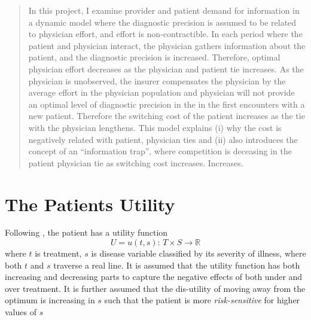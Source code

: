 \documentclass[10pt,a4paper]{article} 					%
\begin{document}
\maketitle


\begin{abstract}
In this project, I examine provider and patient demand for information in a dynamic model where the diagnostic precision is assumed to be related to physician effort, and effort is non-contractible. In each period where the patient and physician interact, the physician gathers information about the patient, and the diagnostic precision is increased. Therefore, optimal physician effort decreases as the physician and patient tie increases. As the physician is unobserved, the insurer compensates the physician by the average effort in the physician population and physician will not provide an optimal level of diagnostic precision in the in the first encounters with a new patient. Therefore the switching cost of the patient increases as the tie with the physician lengthens. This model explains (i) why the cost is negatively related with patient, physician ties and (ii) also introduces the concept of an ``information trap'', where competition is deceasing in the patient physician tie as switching cost increases. Increases.
\end{abstract}


\section{The Patients Utility}

Following \citet{Rochaix1989}, the patient has a utility function
\[
	U = u(t,s):\, T\times S\rightarrow\mathbb{R}
\]
where \(t\) is treatment, \(s\) is disease variable classified by its severity of illness, where both \(t\) and \(s\) traverse a real line. It is assumed that the utility function has both increasing and decreasing parts to capture the negative effects of both under and over treatment. It is further assumed that the dis-utility of moving away from the optimum is increasing in \(s\)  such that the patient is more \emph{risk-sensitive} for higher values of \(s\)
\end{document}
